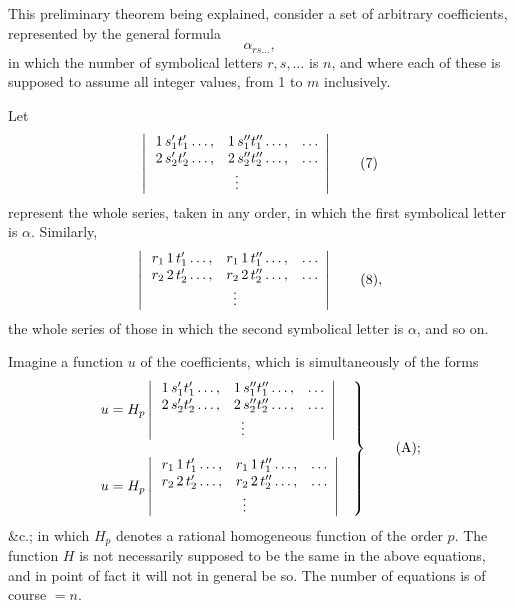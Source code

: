 \documentclass[11pt]{article}
\begin{document}
This preliminary theorem being explained, consider a set of arbitrary coefficients,
represented by the general formula
\[
\alpha_{rs\ldots} \tag{6},
\]
in which the number of symbolical letters $r, s, \ldots$ is $n$, and where each of these is
supposed to assume all integer values, from 1 to $m$ inclusively.

Let
\[
\left|\,
\begin{array}{ccc}
1\,s_1' t_1' \ldots, & 1\,s_1'' t_1'' \ldots, & \ldots\\
2\,s_2' t_2' \ldots, & 2\,s_2'' t_2'' \ldots, & \ldots\\
\multicolumn{3}{c}{\vdots}
\end{array}
\right| \tag{7}
\]
represent the whole series, taken in any order, in which the first symbolical letter
is $\alpha$. Similarly,
\[
\left|\,
\begin{array}{ccc}
r_1\,1\,t_1' \ldots, & r_1\,1\,t_1'' \ldots, & \ldots\\
r_2\,2\,t_2' \ldots, & r_2\,2\,t_2'' \ldots, & \ldots\\
\multicolumn{3}{c}{\vdots}
\end{array}
\right| \tag{8},
\]
the whole series of those in which the second symbolical letter is $\alpha$, and so on.

Imagine a function $u$ of the coefficients, which is simultaneously of the forms
\[
\left.
\begin{aligned}
u &= H_p \left|\,
\begin{array}{ccc}
1\,s_1' t_1' \ldots, & 1\,s_1'' t_1'' \ldots, & \ldots\\
2\,s_2' t_2' \ldots, & 2\,s_2'' t_2'' \ldots, & \ldots\\
\multicolumn{3}{c}{\vdots}
\end{array}
\right|\\[8pt]
u &= H_p \left|\,
\begin{array}{ccc}
r_1\,1\,t_1' \ldots, & r_1\,1\,t_1'' \ldots, & \ldots\\
r_2\,2\,t_2' \ldots, & r_2\,2\,t_2'' \ldots, & \ldots\\
\multicolumn{3}{c}{\vdots}
\end{array}
\right|
\end{aligned}\quad\right\} \tag{A};
\]
\&c.; in which $H_p$ denotes a rational homogeneous function of the order $p$. The
function $H$ is not necessarily supposed to be the same in the above equations, and
in point of fact it will not in general be so. The number of equations is of course $=n$.
\end{document}

